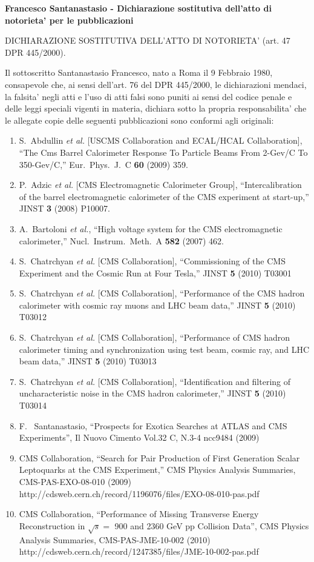 \documentclass[10pt]{letter}
\begin{document}
{\large \sc \bf Francesco Santanastasio - Dichiarazione sostitutiva dell'atto di notorieta' per le pubblicazioni}

DICHIARAZIONE SOSTITUTIVA DELL'ATTO DI NOTORIETA' (art. 47 DPR 445/2000). 

Il sottoscritto Santanastasio Francesco, 
nato a Roma il 9 Febbraio 1980, consapevole che, ai sensi dell'art. 76 del DPR 445/2000, le dichiarazioni mendaci, 
la falsita' negli atti e l'uso di atti falsi sono puniti ai sensi del codice penale e delle leggi speciali vigenti 
in materia, dichiara sotto la propria responsabilita' che le allegate copie delle seguenti pubblicazioni 
sono conformi agli originali: 

\begin{enumerate}
\item S.~Abdullin {\it et al.}  [USCMS Collaboration and ECAL/HCAL Collaboration],
  ``The Cms Barrel Calorimeter Response To Particle Beams From 2-Gev/C To 350-Gev/C,''
  Eur.\ Phys.\ J.\  C {\bf 60} (2009) 359.
\item P.~Adzic {\it et al.}  [CMS Electromagnetic Calorimeter Group],
  ``Intercalibration of the barrel electromagnetic calorimeter of the CMS
  experiment at start-up,'' JINST {\bf 3} (2008) P10007.
\item A.~Bartoloni {\it et al.},
  ``High voltage system for the CMS electromagnetic calorimeter,''
  Nucl.\ Instrum.\ Meth.\  A {\bf 582} (2007) 462.
\item S.~Chatrchyan {\it et al.}  [CMS Collaboration],
  ``Commissioning of the CMS Experiment and the Cosmic Run at Four Tesla,''
  JINST {\bf 5} (2010) T03001
\item S.~Chatrchyan {\it et al.}  [CMS Collaboration],
  ``Performance of the CMS hadron calorimeter with cosmic ray muons and LHC beam data,''
  JINST {\bf 5} (2010) T03012
\item S.~Chatrchyan {\it et al.}  [CMS Collaboration],
  ``Performance of CMS hadron calorimeter timing and synchronization using test beam, cosmic ray, and LHC beam data,''
  JINST {\bf 5} (2010) T03013
\item S.~Chatrchyan {\it et al.}  [CMS Collaboration],
  ``Identification and filtering of uncharacteristic noise in the CMS hadron calorimeter,''
  JINST {\bf 5} (2010) T03014
\item F. ~Santanastasio, ``Prospects for Exotica Searches at ATLAS and CMS Experiments'', 
  Il Nuovo Cimento Vol.32 C, N.3-4 ncc9484 (2009)
\item CMS Collaboration, 
  ``Search for Pair Production of First Generation Scalar Leptoquarks at the CMS Experiment,''
  CMS Physics Analysis Summaries, CMS-PAS-EXO-08-010 (2009) \\
  http://cdsweb.cern.ch/record/1196076/files/EXO-08-010-pas.pdf 
\item CMS Collaboration,
  ``Performance of Missing Transverse Energy Reconstruction in $\sqrt{s}=$ 900 and 2360 GeV pp Collision Data'',
  CMS Physics Analysis Summaries, CMS-PAS-JME-10-002 (2010) \\
  http://cdsweb.cern.ch/record/1247385/files/JME-10-002-pas.pdf


\end{enumerate}
\end{document}
